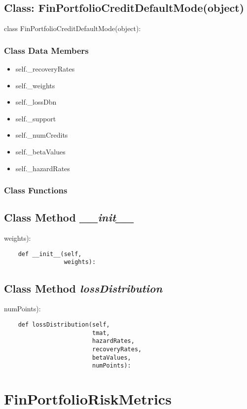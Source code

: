 \documentclass[twoside,11pt]{book}
\begin{document}
\subsection{Class: FinPortfolioCreditDefaultMode(object)}
class FinPortfolioCreditDefaultMode(object):

\subsubsection{Class Data Members}
\begin{itemize}
\item{self.\_recoveryRates}
\item{self.\_weights}
\item{self.\_lossDbn}
\item{self.\_support}
\item{self.\_numCredits}
\item{self.\_betaValues}
\item{self.\_hazardRates}
\end{itemize}

\subsubsection{Class Functions}

\subsection{Class Method {\it \_\_init\_\_}}
weights):

\begin{lstlisting}
    def __init__(self,
                 weights):
\end{lstlisting}

\subsection{Class Method {\it lossDistribution}}
numPoints):

\begin{lstlisting}
    def lossDistribution(self,
                         tmat,
                         hazardRates,
                         recoveryRates,
                         betaValues,
                         numPoints):
\end{lstlisting}

\newpage
\section{FinPortfolioRiskMetrics}
\end{document}
